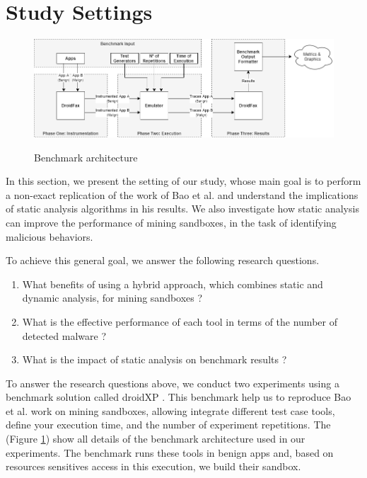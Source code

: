 \section{Study Settings}

\begin{figure}[ht]
  \includegraphics[width=1\textwidth]{images/benchmark3.png}
  \label{benchArq}
  \caption{Benchmark architecture}
  \label{fig:benchArq}
\end{figure}

In this section, we present the setting of our study, whose main goal is to perform a non-exact replication of the work of Bao et al. and understand the implications of static analysis algorithms in his results. We also investigate how static analysis can improve the performance of mining sandboxes, in the task of identifying malicious behaviors.

To achieve this general goal, we answer the following research questions. 

\begin{enumerate}[(RQ1)]
\item What benefits of using a hybrid approach, which combines static and dynamic analysis, for mining sandboxes ?
\item What is the effective performance of each tool in terms of the number of detected malware ?
\item What is the impact of static analysis on benchmark results ?
\end{enumerate}

To answer the research questions above, we conduct two experiments using a benchmark solution called droidXP \cite{DBLP:conf/scam/CostaMCMVBC20}. This benchmark help us to reproduce Bao et al. work on mining sandboxes, allowing integrate different test case tools, define your execution time, and the number of experiment repetitions. The (Figure \ref{fig:benchArq}) show all details of the benchmark architecture used in our experiments. The benchmark runs these tools in benign apps and, based on resources sensitives access in this execution, we build their sandbox.

